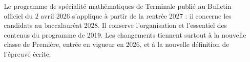 \thispagestyle{otFront}

{\fontsize{10.5}{14.5}\selectfont
Le programme de spécialité mathématiques de Terminale publié au Bulletin officiel du 2 avril 2026 s'applique à partir de la
rentrée 2027 : il concerne les candidats au baccalauréat 2028. Il conserve l'organisation et l'essentiel des contenus du
programme de 2019. Les changements tiennent surtout à la nouvelle classe de Première, entrée en vigueur en 2026, et à la
nouvelle définition de l'épreuve écrite.\par}

